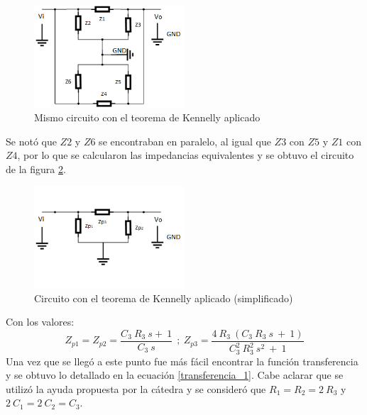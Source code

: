 \begin{figure}[H]                                                       
    \centering\includegraphics[width=0.5\textwidth]{resources/circuitoconKennelly.png}
    \caption{Mismo circuito con el teorema de Kennelly aplicado}
    \label{circuitoconKennelly}
\end{figure}
Se notó que $Z2$ y $Z6$ se encontraban en paralelo, al igual que $Z3$ con $Z5$ y $Z1$ con $Z4$, por lo que se calcularon las impedancias equivalentes y se obtuvo el circuito de la figura \ref{circuitoconKennellysimplificado}.

\begin{figure}[H]                                                       
    \centering\includegraphics[width=0.5\textwidth]{resources/circuitoconKennellysimplificado.png}
    \caption{Circuito con el teorema de Kennelly aplicado (simplificado)}
    \label{circuitoconKennellysimplificado}
\end{figure}

Con los valores:
\begin{equation}
Z_{p1}=Z_{p2}=\dfrac{C_3 \ R_3 \ s + \ 1}{C_3 \ s} \ \ ; \ Z_{p3}=\dfrac{4 \ R_3 \ (C_3 \ R_3 \ s \ + \ 1)}{C_3^2 \ R_3^2 \ s^2 \ + \ 1}
\end{equation}
Una vez que se llegó a este punto fue más fácil encontrar la función transferencia y se obtuvo lo detallado en la ecuación \ref{transferencia_1}.
Cabe aclarar que se utilizó la ayuda propuesta por la cátedra y se consideró que $R_{1} = R_{2}
= 2 \ R_{3}$ y $2 \ C_{1} = 2 \ C_{2} = C_{3}$.

